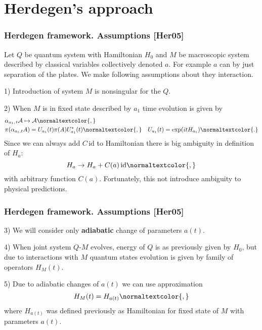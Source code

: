 \documentclass[10pt,t]{beamer}  %
\newcommand{\Ac}{\mathcal{A}}
\begin{document}
\section{Herdegen's approach}



\begin{frame}
  \frametitle{Herdegen framework. Assumptions [Her05]}


  Let $Q$ be quantum system with Hamiltonian $H_{ 0 }$ and $M$ be
  macroscopic system described by classical variables collectively
  denoted $a$. For example $a$ can by just separation of the plates.
  We make following assumptions about they interaction.

  1) Introduction of system $M$ is nonsingular for the $Q$.

  2) When $M$ is in fixed state described by $a_{ 1 }$ time evolution
  is given by
  \begin{align}
    \label{eq:2}
    &\alpha_{ a_{ 1 },\, t } \Ac \mapsto \Ac\normaltextcolor{,} \\
    &\pi( \alpha_{ a_{ 1 }, t } A ) = U_{ a_{ 1 } }( t ) \pi( A )
      U_{ a_{ 1 } }^{ * }( t )\normaltextcolor{,}
      \quad
      U_{ a_{ 1 } }( t ) = \exp( i t H_{ a_{ 1 } } )\normaltextcolor{.}
  \end{align}
  Since we can always add $C \, \textrm{id}$ to Hamiltonian there is
  big ambiguity in definition of $H_{ a }$:
  \begin{equation}
    \label{eq:3}
    H_{ a } \to H_{ a } + C( a ) \, \textrm{id}\normaltextcolor{,}
  \end{equation}
  with arbitrary function $C( a )$. Fortunately, this not introduce
  ambiguity to physical predictions.

\end{frame}





\begin{frame}
  \frametitle{Herdegen framework. Assumptions [Her05]}


  3) We will consider only \textbf{adiabatic} change of parameters
  $a( t )$.

  4) When joint system $Q$-$M$ evolves, energy of $Q$ is as previously
  given by $H_{ 0 }$, but due to interactions with $M$ quantum states
  evolution is given by family of operators $H_{ M }( t )$.

  5) Due to adiabatic changes of $a( t )$ we can use approximation
  \begin{equation}
    \label{eq:4}
    H_{ M }( t ) = H_{ a( t ) }\normaltextcolor{,}
  \end{equation}
  where $H_{ a( t ) }$ was defined previously as Hamiltonian for fixed
  state of $M$ with parameters $a( t )$.

\end{frame}
\end{document}
